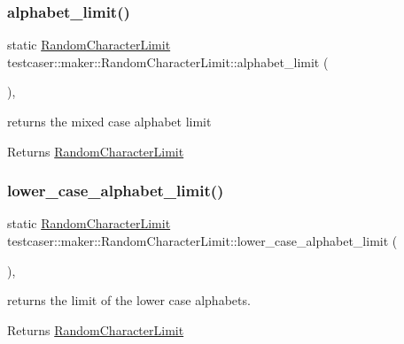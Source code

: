 \subsubsection{\texorpdfstring{alphabet\_limit()}{alphabet\_limit()}}
{\footnotesize\ttfamily static \mbox{\hyperlink{classtestcaser_1_1maker_1_1RandomCharacterLimit}{Random\+Character\+Limit}} testcaser\+::maker\+::\+Random\+Character\+Limit\+::alphabet\+\_\+limit (\begin{DoxyParamCaption}{ }\end{DoxyParamCaption})\hspace{0.3cm}{\ttfamily [inline]}, {\ttfamily [static]}}



returns the mixed case alphabet limit 

\begin{DoxyReturn}{Returns}
\mbox{\hyperlink{classtestcaser_1_1maker_1_1RandomCharacterLimit}{Random\+Character\+Limit}} 
\end{DoxyReturn}
\mbox{\label{classtestcaser_1_1maker_1_1RandomCharacterLimit_ae6e40c00b9225a88b0133c17d4b24f90}} 
\subsubsection{\texorpdfstring{lower\_case\_alphabet\_limit()}{lower\_case\_alphabet\_limit()}}
{\footnotesize\ttfamily static \mbox{\hyperlink{classtestcaser_1_1maker_1_1RandomCharacterLimit}{Random\+Character\+Limit}} testcaser\+::maker\+::\+Random\+Character\+Limit\+::lower\+\_\+case\+\_\+alphabet\+\_\+limit (\begin{DoxyParamCaption}{ }\end{DoxyParamCaption})\hspace{0.3cm}{\ttfamily [inline]}, {\ttfamily [static]}}



returns the limit of the lower case alphabets. 

\begin{DoxyReturn}{Returns}
\mbox{\hyperlink{classtestcaser_1_1maker_1_1RandomCharacterLimit}{Random\+Character\+Limit}} 
\end{DoxyReturn}
\mbox{\label{classtestcaser_1_1maker_1_1RandomCharacterLimit_a230a33b5d028fdef4a027f7c96663d32}} 
